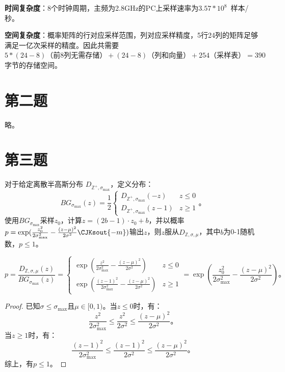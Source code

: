 \documentclass{article}
\begin{document}
    \textbf{时间复杂度}：8个时钟周期，主频为2.8GHz的PC上采样速率为$3.57*10^8$~样本/秒。
    
    \textbf{空间复杂度}：概率矩阵的行对应采样范围，列对应采样精度，5行24列的矩阵足够满足一亿次采样的精度。因此共需要$5 * (24-8)\mbox{（前8列无需存储）} + (24-8)\mbox{（列和向量）} + 254\mbox{（采样表）} = 390$字节的存储空间。
    

    \section{第二题}
    略。

    \section{第三题}
    对于给定离散半高斯分布 $D_{\mathbb{Z}^+, \sigma_{\mathrm{max}}}$，定义分布：
    \begin{equation}
        BG_{\sigma_{\mathrm{max}}}(z) = \frac{1}{2} 
        \begin{cases}
            D_{\mathbb{Z}^+, \sigma_{\mathrm{max}}}(-z) & z \leq 0 \\
            D_{\mathbb{Z}^+, \sigma_{\mathrm{max}}}(z - 1) & z \geq 1
        \end{cases}
        \mbox{。}
    \end{equation}
    使用$BG_{\sigma_{\mathrm{max}}}$采样$z_0$，计算$z = (2b - 1) \cdot z_0 + b$，并以概率$p = \exp(\frac{z_0^2}{2\sigma_{\mathrm{max}}^2} - \frac{(z - \mu)^2}{2\sigma^2} \CJKsout{- m})$输出$z$，则$z$服从$D_{\mathbb{Z}, \sigma, \mu}$，其中$b$为0-1随机数，$p \leq 1$。

    \begin{equation}
        p = \frac{D_{\mathbb{Z}, \sigma, \mu}(z)}{BG_{\sigma_{\mathrm{max}}}(z)} = 
        \begin{cases}
            \exp(\frac{z^2}{2\sigma_{\mathrm{max}}^2} - \frac{(z - \mu)^2}{2\sigma^2}) & z \leq 0 \\
            \exp(\frac{(z - 1)^2}{2\sigma_{\mathrm{max}}^2} - \frac{(z - \mu)^2}{2\sigma^2}) & z \geq 1
        \end{cases}
         = \exp(\frac{z_0^2}{2\sigma_{\mathrm{max}}^2} - \frac{(z - \mu)^2}{2\sigma^2})
         \mbox{。}
    \end{equation}

    \begin{proof}
        已知$\sigma \leq \sigma_{\mathrm{max}}$且$\mu \in [0, 1)$。当$z \leq 0$时，有：
        \begin{equation*}
            \frac{z^2}{2\sigma_{\mathrm{max}}^2} \leq \frac{z^2}{2\sigma^2} \leq \frac{(z - \mu)^2}{2\sigma^2}
            \mbox{。}
        \end{equation*}
        当$z \geq 1$时，有：
        \begin{equation*}
            \frac{(z - 1)^2}{2\sigma_{\mathrm{max}}^2} \leq \frac{(z - 1)^2}{2\sigma^2} \leq \frac{(z - \mu)^2}{2\sigma^2}
            \mbox{。}
        \end{equation*}
        综上，有$p \leq 1$。
    \end{proof}
\end{document}

